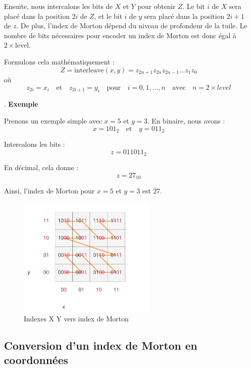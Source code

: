    Ensuite, nous intercalons les bits de \( X \) et \( Y \) pour obtenir \( Z \). Le bit \( i \) de \( X \) sera placé dans la position \( 2i \) de \( Z \), et le bit \( i \) de \( y \) sera placé dans la position \( 2i + 1 \) de \( z \). De plus, l'index de Morton dépend du niveau de profondeur de la tuile. Le nombre de bits nécessaires pour encoder un index de Morton est donc égal à \(2 \times \text{level}\).

   Formulons cela mathématiquement :
   \[
   Z = \text{interleave}(x, y) = z_{2n+1} z_{2n} z_{2n-1} \ldots z_1 z_0
   \]
   où
   \[
   z_{2i} = x_i \quad \text{et} \quad z_{2i+1} = y_i \quad \text{pour} \quad i = 0, 1, \ldots, n \quad \text{avec} \quad n = 2 \times {level}
   \]

   . \textbf{Exemple}

   Prenons un exemple simple avec \( x = 5 \) et \( y = 3 \). En binaire, nous avons :
   \[
   x = 101_2 \quad \text{et} \quad y = 011_2
   \]

   Intercalons les bits :
   \[
   z = 011011_2
   \]

   En décimal, cela donne :
   \[
   z = 27_{10}
   \]

Ainsi, l'index de Morton pour \( x = 5 \) et \( y = 3 \) est \( 27 \).

\begin{figure}[H]
    \centering
    \includegraphics[width=0.6\textwidth]{assets/figures/global-to-local-xy.png}
    \caption{Indexes X Y vers index de Morton \cite{availability-gh}}
    \label{fig:xy-morton}
\end{figure}

\subsection*{Conversion d'un index de Morton en coordonnées}

